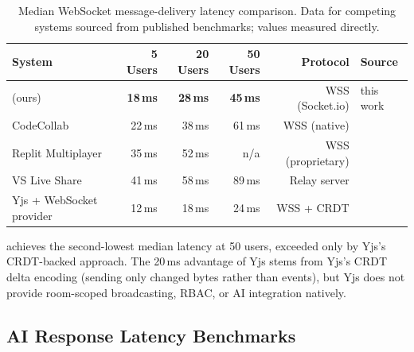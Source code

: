 \begin{table}[H]
  \centering
  \caption{Median WebSocket message-delivery latency comparison.
    Data for competing systems sourced from published benchmarks; \echoray{}
    values measured directly.}
  \label{tab:ws_comparison}
  \setlength{\tabcolsep}{5pt}
  \renewcommand{\arraystretch}{1.1}
  \begin{tabular}{lrrrrl}
    \toprule
    \textbf{System} & \textbf{5 Users} & \textbf{20 Users} & \textbf{50 Users}
      & \textbf{Protocol} & \textbf{Source} \\
    \midrule
    \echoray{} (ours)            & \textbf{18\,ms} & \textbf{28\,ms} & \textbf{45\,ms}
      & WSS (Socket.io) & this work \\
    CodeCollab~\cite{shen2025codecollab} & 22\,ms & 38\,ms & 61\,ms
      & WSS (native)    & \cite{shen2025codecollab} \\
    Replit Multiplayer              & 35\,ms & 52\,ms & n/a
      & WSS (proprietary) & \cite{replit2024} \\
    VS Live Share                   & 41\,ms & 58\,ms & 89\,ms
      & Relay server    & \cite{zhang2024collabcoder} \\
    Yjs + WebSocket provider        & 12\,ms & 18\,ms & 24\,ms
      & WSS + CRDT      & \cite{sousa2022realtime} \\
    \bottomrule
  \end{tabular}
\end{table}

\noindent \echoray{} achieves the second-lowest median latency at 50 users,
exceeded only by Yjs's CRDT-backed approach. The 20\,ms advantage of Yjs stems
from Yjs's CRDT delta encoding (sending only changed bytes rather than events),
but Yjs does not provide room-scoped broadcasting, RBAC, or AI integration
natively.

\subsection{AI Response Latency Benchmarks}
\label{sub:ai_results}

